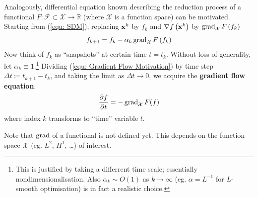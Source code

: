 \documentclass[../dissertation.tex]{subfiles}
\begin{document}
Analogously, differential equation known describing the reduction process of a functional $F:\mathcal{F} \subset \mathcal{X} \rightarrow \mathbb{R}$ (where $\mathcal{X}$ is a function space) can be motivated.
Starting from (\ref{equ: SDM}), replacing $\mathbf{x}^{k}$ by $f_k$ and $\nabla f\left( \mathbf{x}^k \right)$ by $\operatorname{grad}_{\mathcal{X}} F\left( f_k \right)$
\begin{equation}
    f_{k+1} = f_k - \alpha_k \operatorname{grad}_{\mathcal{X}} F \left( f_k \right)
    \label{equ: Gradient Flow Motivation}
\end{equation}
Now think of $f_k$ as ``snapshots'' at certain time $t = t_k$.
Without loss of generality, let $\alpha_k \equiv 1$.\footnote{
This is justified by taking a differrent time scale; essentially nondimensionalisation.
Also $\alpha_k \sim O (1)$ as $k \rightarrow \infty$ (eg. $\alpha = L^{-1}$ for $L$-smooth optimisation) is in fact a realistic choice.}
Dividing (\ref{equ: Gradient Flow Motivation}) by time step $\Delta t \coloneqq t_{k+1} - t_k$,
and taking the limit as $\Delta t \rightarrow 0$,
we acquire the \textbf{gradient flow equation}\cite{YSC2021}.
\begin{equation}
    \frac{\partial f}{\partial t} = - \operatorname{grad}_{\mathcal{X}} F (f)
\end{equation}
where index $k$ transforms to ``time'' variable $t$.

Note that $\operatorname{grad}$ of a functional is not defined yet. This depends on the function space $\mathcal{X}$ (eg. $L^2$, $H^1$, \ldots) of interest.
\end{document}
